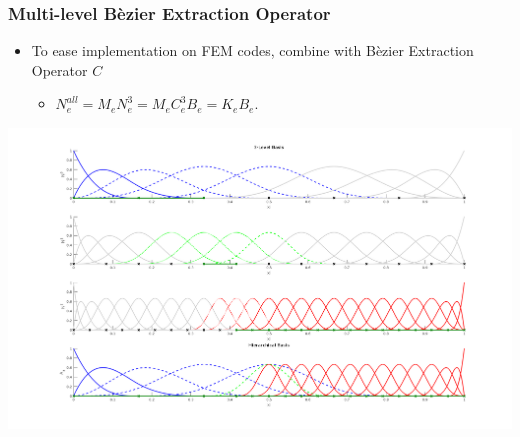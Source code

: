 \documentclass{beamer}
\begin{document}
%	

\begin{frame}
	\frametitle{Multi-level B\`ezier Extraction Operator}
	\begin{itemize}
			\item To ease implementation on FEM codes, combine with B\`ezier Extraction Operator $ C $
			\begin{itemize}
				\item $ N_e^{\textit{all}} = M_e N_e^3 = M_e C^3_e B_e = K_e B_e$.
			\end{itemize}
	\end{itemize}
	
	
	\includegraphics[width=\textwidth]{operators1d/multiLevelBasis.png}
	
\end{frame}
\end{document}

